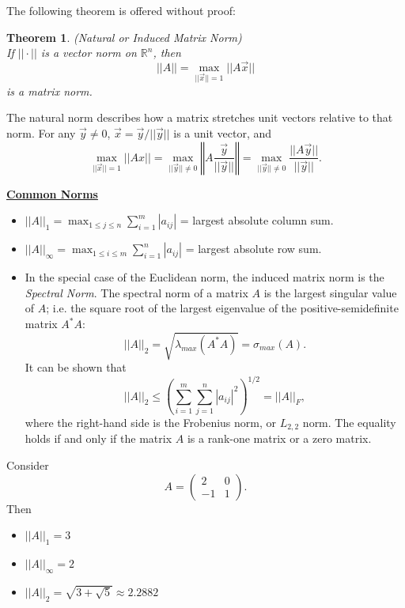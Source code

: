 \documentclass[12pt]{article}
\newcommand{\vecx}{\ensuremath{\vec{x}}}
\newcommand{\vecy}{\ensuremath{\vec{y}}}
\newtheorem{theorem}{Theorem}
\newenvironment{example}[1][Example]{\begin{trivlist}
\item[\hskip \labelsep {\bfseries #1}]}{\end{trivlist}}
\begin{document}
\vspace*{1em}

The following theorem is offered without proof:
\begin{theorem} (Natural or Induced Matrix Norm)\\
If $||\cdot||$ is a vector norm on $\mathbb{R}^n$, then
\[
||A|| = \max_{||\vecx|| =1} ||A\vecx||
\]
is a matrix norm.
\end{theorem}

\vspace*{1em}

The natural norm describes how a matrix stretches unit vectors
relative to that norm.
For any $\vecy \ne 0$, $\vecx = \vecy/||\vecy||$ is a unit vector, and
\[
\max_{||\vecx||=1}||Ax|| = \max_{||\vecy||\ne 0}\left\Vert A\frac{\vecy}{||\vecy||}\right\Vert = \max_{||\vecy||\ne 0}\frac{||A\vecy||}{||\vecy||}.
\] 

\vspace*{1em}
\underline{\textbf{Common Norms}}

\begin{itemize}
\item $
||A||_1 = \displaystyle{\max_{1\leq j\leq n}}\displaystyle{\sum_{i=1}^m}|a_{ij}|$ = largest absolute column sum.
\item $||A||_\infty = \displaystyle{\max_{1\leq i\leq m}}\displaystyle{\sum_{i=1}^n}|a_{ij}|$ = largest absolute row sum. 
\item In the special case of the Euclidean norm, the induced matrix norm is the \textit{Spectral Norm}.
The spectral norm of a matrix $A$ is the largest singular value of $A$; i.e. the square root of the largest eigenvalue of the positive-semidefinite matrix $A^*A$:
\[
||A||_2 = \sqrt{\lambda_{max}(A^* A)} = \sigma_{max}(A).
\]
It can be shown that
\[
||A||_2 \leq \left(\sum_{i=1}^m\sum_{j=1}^n |a_{ij}|^2\right)^{1/2} = ||A||_F,
\]
where the right-hand side is the Frobenius norm, or $L_{2,2}$ norm.
The equality holds if and only if the matrix $A$ is a rank-one matrix or a zero matrix.
\end{itemize}
\pagebreak

\begin{example}
Consider 
\[
A = \left(\begin{array}{cc}
2 & 0  \\ -1 & 1 
\end{array}
\right).
\]
Then
\begin{itemize}
\item[i.] $||A||_1 = 3$
\item[ii.] $||A||_\infty = 2$
\item[iii.] $||A||_2 = \sqrt{3+\sqrt{5}} \approx 2.2882$
\end{itemize}
\end{example}
\end{document}
